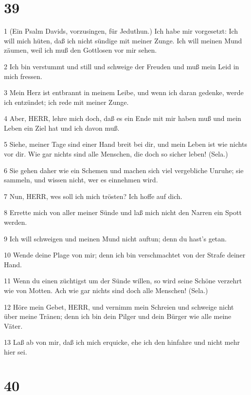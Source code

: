 \chapter{39}

\par 1 (Ein Psalm Davids, vorzusingen, für Jeduthun.) Ich habe mir vorgesetzt: Ich will mich hüten, daß ich nicht sündige mit meiner Zunge. Ich will meinen Mund zäumen, weil ich muß den Gottlosen vor mir sehen.
\par 2 Ich bin verstummt und still und schweige der Freuden und muß mein Leid in mich fressen.
\par 3 Mein Herz ist entbrannt in meinem Leibe, und wenn ich daran gedenke, werde ich entzündet; ich rede mit meiner Zunge.
\par 4 Aber, HERR, lehre mich doch, daß es ein Ende mit mir haben muß und mein Leben ein Ziel hat und ich davon muß.
\par 5 Siehe, meiner Tage sind einer Hand breit bei dir, und mein Leben ist wie nichts vor dir. Wie gar nichts sind alle Menschen, die doch so sicher leben! (Sela.)
\par 6 Sie gehen daher wie ein Schemen und machen sich viel vergebliche Unruhe; sie sammeln, und wissen nicht, wer es einnehmen wird.
\par 7 Nun, HERR, wes soll ich mich trösten? Ich hoffe auf dich.
\par 8 Errette mich von aller meiner Sünde und laß mich nicht den Narren ein Spott werden.
\par 9 Ich will schweigen und meinen Mund nicht auftun; denn du hast's getan.
\par 10 Wende deine Plage von mir; denn ich bin verschmachtet von der Strafe deiner Hand.
\par 11 Wenn du einen züchtigst um der Sünde willen, so wird seine Schöne verzehrt wie von Motten. Ach wie gar nichts sind doch alle Menschen! (Sela.)
\par 12 Höre mein Gebet, HERR, und vernimm mein Schreien und schweige nicht über meine Tränen; denn ich bin dein Pilger und dein Bürger wie alle meine Väter.
\par 13 Laß ab von mir, daß ich mich erquicke, ehe ich den hinfahre und nicht mehr hier sei.

\chapter{40}

